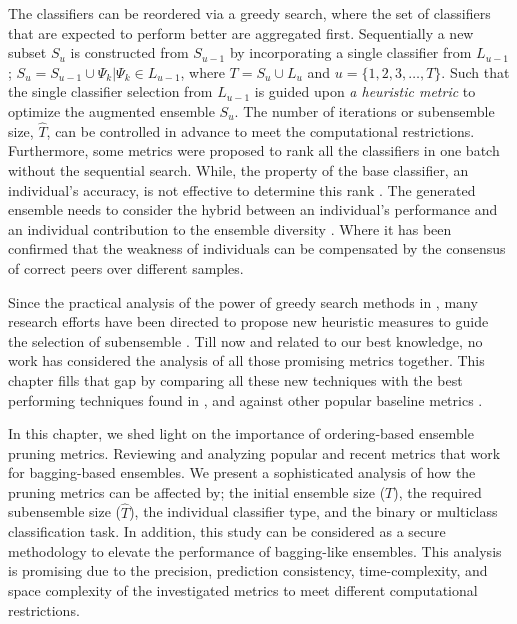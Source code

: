 The classifiers can be reordered via a greedy search, where the set of classifiers that are expected to perform better are aggregated first. Sequentially a new subset $S_u$ is constructed from $S_{u-1}$ by incorporating a single classifier from $L_{u-1}$; $S_{u}=S_{u-1}\cup \Psi_{k} \Big| \Psi_{k} \in L_{u-1}$, where $T= S_u \cup L_u$ and $u=\{1,2,3,\dots,T\}$. Such that the single classifier selection from $L_{u-1}$ is guided upon \textit{a heuristic metric} to optimize the augmented ensemble $S_u$. The number of iterations or subensemble size, $\hat{T}$, can be controlled in advance to meet the computational restrictions. Furthermore, some metrics were proposed to rank all the classifiers in one batch without the sequential search. While, the property of the base classifier, an individual's accuracy, is not effective to determine this rank \cite{martinez2004}. The generated ensemble needs to consider the hybrid between an individual's performance and an individual contribution to the ensemble diversity \cite{guo2018,lu2010}. Where it has been confirmed that the weakness of individuals can be compensated by the consensus of correct peers over different samples. 

Since the practical analysis of the power of greedy search methods in \cite{martinez2009}, many research efforts have been directed to propose new heuristic measures to guide the selection of subensemble  \cite{cao2018,guo2013,guo2018,lu2010}. Till now and related to our best knowledge, no work has considered the analysis of all those promising metrics together. This chapter fills that gap by comparing all these new techniques with the best performing techniques found in \cite{martinez2009}, and against other popular baseline metrics \cite{martinez2004,margineantu1997}.

In this chapter, we shed light on the importance of ordering-based ensemble pruning metrics. Reviewing and analyzing popular and recent metrics that work for bagging-based ensembles. We present a sophisticated analysis of how the pruning metrics can be affected by; the initial ensemble size ($T$), the required subensemble size ($\hat{T}$), the individual classifier type, and the binary or multiclass classification task.  In addition, this study can be considered as a secure methodology to elevate the performance of bagging-like ensembles. This analysis is promising due to the precision, prediction consistency, time-complexity, and space complexity of the investigated metrics to meet different computational restrictions. 


